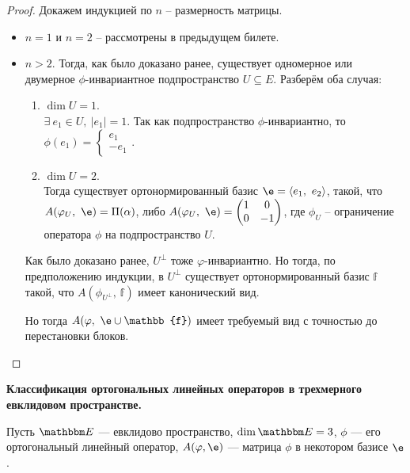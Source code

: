\begin{proof}

Докажем индукцией по $n$ -- размерность матрицы.

\begin{itemize}
    \item $n = 1$ и $n = 2$ -- рассмотрены в предыдущем билете.
    
    \item $n > 2$. Тогда, как было доказано ранее, существует одномерное или двумерное $\phi$-инвариантное подпространство $U \subseteq E$. Разберём оба случая:
    \begin{enumerate}
        \item $\dim{U} = 1$.\\ $\exists\ e_1 \in U,\ |e_1| = 1$. Так как подпространство $\phi$-инвариантно, то $\phi(e_1) = \begin{cases}e_1 \\ -e_1 \end{cases}$.
        \item $\dim{U} = 2$.\\ Тогда существует ортонормированный базис $\e = \langle e_1,\ e_2 \rangle$, такой, что $A(\phi_U,\ \e) = \Pi(\alpha)$, либо $A(\phi_U,\ \e) = \begin{pmatrix} 1 & 0 \\ 0 & -1\end{pmatrix}$, где $\phi_U$ -- ограничение оператора $\phi$ на подпространство $U$. 
    \end{enumerate}
    
    Как было доказано ранее, $U^\perp$ тоже $\varphi$-инвариантно. Но тогда, по предположению индукции, в $U^\perp$ существует ортонормированный базис $\mathbb{f}$ такой, что $A(\phi_{U^\perp},\ \mathbb{f})$ имеет канонический вид.
    
    Но тогда $A(\phi,\ \e \cup \mathbb{f})$ имеет требуемый вид с точностью до перестановки блоков.
\end{itemize}
\end{proof}


\textbf{Классификация ортогональных линейных операторов в трехмерного евклидовом пространстве.}

Пусть $\E$ --- евклидово пространство, $\dim \E = 3$, $\phi$ --- его ортогональный линейный оператор, $A(\phi, \e)$ --- матрица $\phi$ в некотором базисе $\e$.

